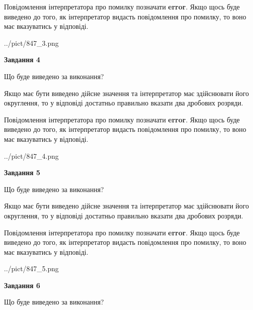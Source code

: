 \documentclass[12pt, ukrainian]{article}
\begin{document}
{\begin {Large}
Повідомлення інтерпретатора про помилку позначати \textbf{error}.
Якщо щось буде виведено до того, як інтерпретатор видасть повідомлення про помилку, 
то воно має вказуватись у відповіді. \par

\begin{center}
	{../pict/847_3.png}
\end{center}
\newpage

{\begin {center}\textbf{Завдання 4}\end {center}}\par
Що буде виведено за виконання? \par

Якщо має бути виведено дійсне значення та інтерпретатор має здійснювати його округлення, 
то у відповіді достатньо правильно вказати два дробових розряди.

Повідомлення інтерпретатора про помилку позначати \textbf{error}.
Якщо щось буде виведено до того, як інтерпретатор видасть повідомлення про помилку, 
то воно має вказуватись у відповіді. \par

\begin{center}
	{../pict/847_4.png}
\end{center}
\newpage

{\begin {center}\textbf{Завдання 5}\end {center}}\par
Що буде виведено за виконання? \par

Якщо має бути виведено дійсне значення та інтерпретатор має здійснювати його округлення, 
то у відповіді достатньо правильно вказати два дробових розряди.

Повідомлення інтерпретатора про помилку позначати \textbf{error}.
Якщо щось буде виведено до того, як інтерпретатор видасть повідомлення про помилку, 
то воно має вказуватись у відповіді. \par

\begin{center}
	{../pict/847_5.png}
\end{center}
\newpage

{\begin {center}\textbf{Завдання 6}\end {center}}\par
Що буде виведено за виконання? \par


\end{Large}}
\end{document}
